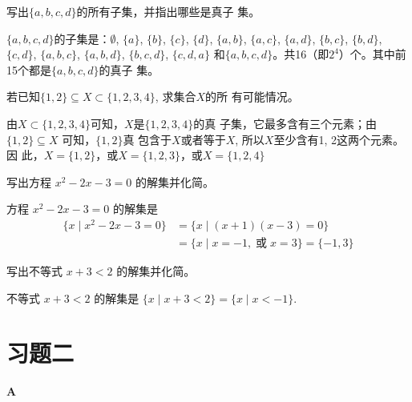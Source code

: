 \begin{example}
    写出$\{a,b,c,d\}$的所有子集，并指出哪些是真子
集。
\end{example}

\begin{solution}
$\{a,b,c,d\}$的子集是：$\emptyset$, $\{a\}$, $\{b\}$, $\{c\}$, $\{d\}$, $\{a, b\}$, $\{a, c\}$, $\{a, d\}$, $\{b, c\}$, $\{b, d\}$, $\{c,d\}$, $\{a,b,c\}$, $\{a, b, d\}$, $\{b,c,d\}$, $\{c,d,a\}$ 和$\{a,b,c,
d\}$。共16（即$2^4$）个。其中前15个都是$\{a,b,c,d\}$的真子
集。
\end{solution}

\begin{example}
    若已知$\{1,2\}\subseteq X\subset \{1,2,3,4\}$, 求集合$X$的所
    有可能情况。
\end{example}

\begin{solution}
    由$X\subset \{1,2,3,4\}$可知，$X$是$\{1,2,3,4\}$的真
子集，它最多含有三个元素；由$\{1,2\}\subseteq X$
可知，$\{1,2\}$真
包含于$X$或者等于$X$, 所以$X$至少含有1, 2这两个元素。因
此，$X=\{1,2\}$，或$X=\{1,2,3\}$，或$X=\{1,2,4\}$
\end{solution}


\begin{example}
    写出方程
$x^2-2x-3=0$
的解集并化简。
\end{example}

\begin{solution}
    方程
    $x^2-2x-3=0$
的解集是
\[\begin{split}
    \{x\mid x^2-2x-3=0\}&=\{x\mid (x+1)(x-3)=0\}\\
    &=\{x\mid x=-1,\; \text{或}\; x=3\}=\{-1,3\}
\end{split}\]
\end{solution}

\begin{example}
    写出不等式
$x+3<2$
的解集并化简。
\end{example}

\begin{solution}
    不等式
$x+3<2$
的解集是
$\{x\mid x+3<2\}=\{x\mid x<-1\}$.
\end{solution}


\section*{习题二}
\begin{center}
    \bfseries A
\end{center}


